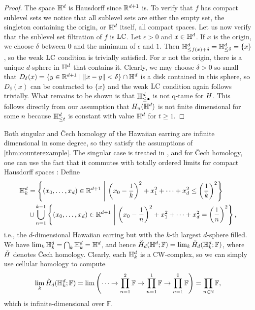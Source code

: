 \begin{proof}
	The space $\mathbb{H}^d$ is Hausdorff %
	since $\mathbb{R}^{d+1}$ is.
	To verify that $f$ has compact sublevel sets we notice that all sublevel sets are either the empty set, the singleton containing the origin, or $\mathbb{H}^d$ itself, all compact spaces.
	Let us now verify that the sublevel set filtration of $f$ is $\mathrm{LC}$.
	Let $\epsilon > 0$ and $x \in \mathbb{H}^d$.
	If $x$ is the origin, we choose $\delta$ between $0$ and the minimum of $\epsilon$ and $1$.
	Then $\mathbb{H}^d_{\leq f(x) + \delta} = \mathbb{H}^d_{\leq \delta} = \{x\}$, so the weak $\mathrm{LC}$ condition is trivially satisfied.
	For $x$ not the origin, there is a unique $d$-sphere in $\mathbb{H}^d$ that contains it.
	Clearly, we may choose $\delta > 0$ so small that $D_\delta(x) = \{y \in \mathbb{R}^{d+1} \mid \Vert x - y \Vert < \delta\} \cap \mathbb{H}^d$ is a disk contained in this sphere, so $D_\delta(x)$ can be contracted to $\{x\}$ and the weak $\mathrm{LC}$ condition again follows trivially.
	What remains to be shown is that $\mathbb{H}^d_{\leq \bullet}$ is not q-tame for $H$.
This follows directly from our assumption that $H_{n}(\mathbb{H}^d)$ is not finite dimensional for some $n$ because $\mathbb{H}^d_{\leq t}$ is constant with value $\mathbb{H}^d$ for $t \geq 1$.
\end{proof}

Both singular and \v{C}ech homology of the Hawaiian earring are infinite dimensional in some degree, so they satisfy the assumptions of \cref{thm:counterexample}.
The singular case is treated in \cite{Barratt.1962}, and for \v{C}ech homology, one can use the fact that it commutes with totally ordered limits for compact Hausdorff spaces \cite[Theorems VIII.3.6.\@ and X.3.1.]{MR0050886}:
Define 
\begin{align*}
\HE_k &= \left\{ (x_0, \dots, x_d) \in \R^{d+1} \ \middle|\  \left( x_0 - \frac{1}{k} \right)^2 + x_1^2 + \dots + x_d^2 \leq \left( \frac{1}{k} \right)^2 \right\} \\
& \cup \bigcup_{n=1}^{k-1} \left\{ (x_0, \dots, x_d) \in \R^{d+1} \ \middle|\  \left( x_0 - \frac{1}{n} \right)^2 + x_1^2 + \dots + x_d^2 = \left( \frac{1}{n} \right)^2 \right \},
\end{align*}
i.e., the $d$-dimensional Hawaiian earring but with the $k$-th largest $d$-sphere filled.
We have $\lim_{k} \mathbb{H}^d_{k} = \bigcap_{k} \mathbb{H}^d_{k} = \mathbb{H}^d$, and hence $\check{H}_{d}(\mathbb{H}^d; \mathbb{F}) = \lim_{k} \check{H}_{d}(\mathbb{H}^d_{k}; \mathbb{F})$, where $\check{H}$ denotes \v{C}ech homology.
Clearly, each $\mathbb{H}^d_{k}$ is a CW-complex, so we can simply use cellular homology to compute
\begin{equation*}
\lim_{k}\check{H}_{d}(\mathbb{H}^{d}_{k}; \mathbb{F})=\lim\left(\dots\to \prod_{n=1}^2\mathbb{F}\to \prod_{n=1}^1\mathbb{F}\to \prod_{n=1}^0\mathbb{F}\right)=\prod_{n\in\mathbb{N}}\mathbb{F},
\end{equation*}
which is infinite-dimensional over $\mathbb{F}$.

